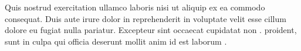\documentclass[a0, portrait]{a0poster}
\begin{document}
\begin{multicols}{3}
Quis nostrud exercitation ullamco laboris nisi ut aliquip ex ea commodo
consequat. Duis aute irure dolor in reprehenderit in voluptate velit esse
cillum dolore eu fugiat nulla pariatur. Excepteur sint occaecat cupidatat non \cite{Nom2012}.
proident, sunt in culpa qui officia deserunt mollit anim id est laborum \cite{ggmap,mapdata}.



\nocite{*} %


\end{multicols}
\end{document}
